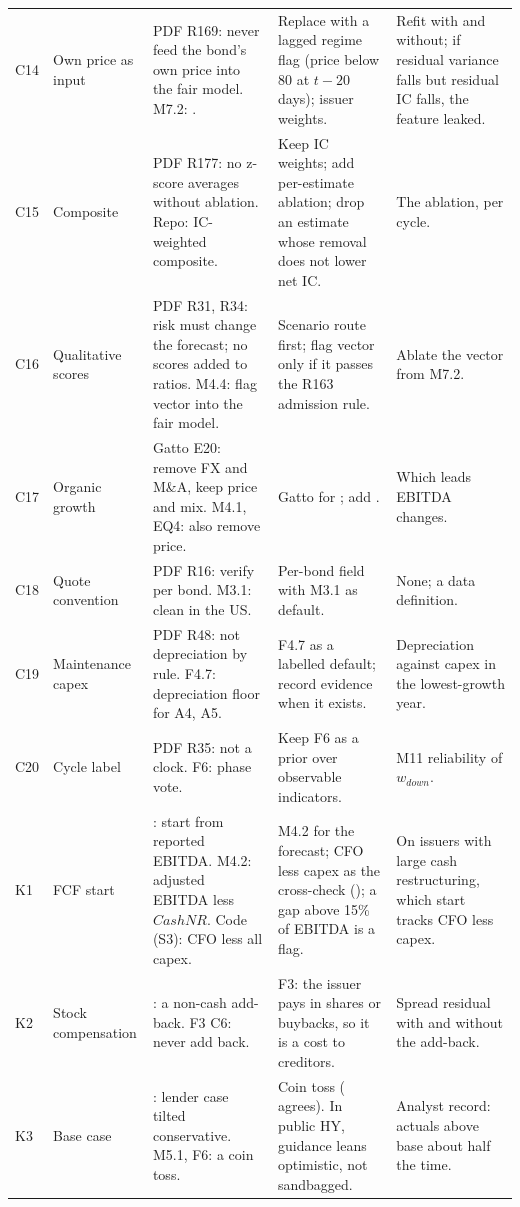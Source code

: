 \documentclass[11pt]{article}
\begin{document}
{\begin{xltabular}{\linewidth}{@{}>{\raggedright\arraybackslash}p{9mm}>{\raggedright\arraybackslash}p{24mm}>{\raggedright\arraybackslash}X>{\raggedright\arraybackslash}p{38mm}>{\raggedright\arraybackslash}p{30mm}@{}}
C14 & Own price as input & PDF R169: never feed the bond's own price into the fair model. M7.2: . & Replace with a lagged regime flag (price below 80 at $t-20$ days); issuer weights. & Refit with and without; if residual variance falls but residual IC falls, the feature leaked. \\
C15 & Composite & PDF R177: no z-score averages without ablation. Repo: IC-weighted composite. & Keep IC weights; add per-estimate ablation; drop an estimate whose removal does not lower net IC. & The ablation, per cycle. \\
C16 & Qualitative scores & PDF R31, R34: risk must change the forecast; no scores added to ratios. M4.4: flag vector into the fair model. & Scenario route first; flag vector only if it passes the R163 admission rule. & Ablate the vector from M7.2. \\
C17 & Organic growth & Gatto E20: remove FX and M\&A, keep price and mix. M4.1, EQ4: also remove price. & Gatto for ; add . & Which leads EBITDA changes. \\
C18 & Quote convention & PDF R16: verify per bond. M3.1: clean in the US. & Per-bond field with M3.1 as default. & None; a data definition. \\
C19 & Maintenance capex & PDF R48: not depreciation by rule. F4.7: depreciation floor for A4, A5. & F4.7 as a labelled default; record evidence when it exists. & Depreciation against capex in the lowest-growth year. \\
C20 & Cycle label & PDF R35: not a clock. F6: phase vote. & Keep F6 as a prior over observable indicators. & M11 reliability of $w_{down}$. \\
\midrule
K1 & FCF start & : start from reported EBITDA. M4.2: adjusted EBITDA less $CashNR$. Code (S3): CFO less all capex. & M4.2 for the forecast; CFO less capex as the cross-check (); a gap above 15\% of EBITDA is a flag. & On issuers with large cash restructuring, which start tracks CFO less capex. \\
K2 & Stock compensation & : a non-cash add-back. F3 C6: never add back. & F3: the issuer pays in shares or buybacks, so it is a cost to creditors. & Spread residual with and without the add-back. \\
K3 & Base case & : lender case tilted conservative. M5.1, F6: a coin toss. & Coin toss ( agrees). In public HY, guidance leans optimistic, not sandbagged. & Analyst record: actuals above base about half the time. \\

\end{xltabular}}
\end{document}
